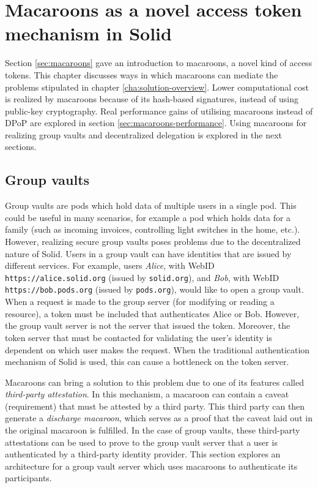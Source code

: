 \chapter{Macaroons as a novel access token mechanism in Solid}
\label{cha:macaroons-solid}

Section \ref{sec:macaroons} gave an introduction to macaroons, a novel kind of access tokens. This chapter discusses ways in which macaroons can mediate the problems stipulated in chapter \ref{cha:solution-overview}. Lower computational cost is realized by macaroons because of its hash-based signatures, instead of using public-key cryptography. Real performance gains of utilising macaroons instead of \gls{DPoP} are explored in section \ref{sec:macaroons-performance}. Using macaroons for realizing group vaults and decentralized delegation is explored in the next sections.

\section{Group vaults}
\label{sec:group-vaults}
Group vaults are pods which hold data of multiple users in a single pod. This could be useful in many scenarios, for example a pod which holds data for a family (such as incoming invoices, controlling light switches in the home, etc.). However, realizing secure group vaults poses problems due to the decentralized nature of Solid. Users in a group vault can have identities that are issued by different services. For example, users \textit{Alice}, with WebID \texttt{https://alice.solid.org} (issued by \texttt{solid.org}), and \textit{Bob}, with WebID \texttt{https://bob.pods.org} (issued by \texttt{pods.org}), would like to open a group vault. When a request is made to the group server (for modifying or reading a resource), a token must be included that authenticates Alice or Bob. However, the group vault server is not the server that issued the token. Moreover, the token server that must be contacted for validating the user's identity is dependent on which user makes the request. When the traditional authentication mechanism of Solid is used, this can cause a bottleneck on the token server. 

Macaroons can bring a solution to this problem due to one of its features called \textit{third-party attestation}. In this mechanism, a macaroon can contain a caveat (requirement) that must be attested by a third party. This third party can then generate a \textit{discharge macaroon}, which serves as a proof that the caveat laid out in the original macaroon is fulfilled. In the case of group vaults, these third-party attestations can be used to prove to the group vault server that a user is authenticated by a third-party identity provider. This section explores an architecture for a group vault server which uses macaroons to authenticate its participants.

